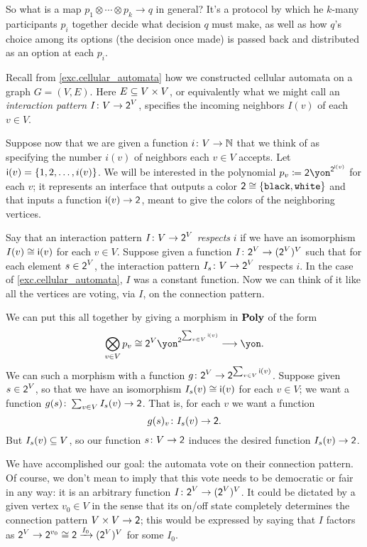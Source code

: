 \documentclass[Book-Poly]{subfiles}
\begin{document}
So what is a map $p_1\otimes\cdots\otimes p_k\to q$ in general? It's a protocol by which he $k$-many participants $p_i$ together decide what decision $q$ must make, as well as how $q$'s choice among its options (the decision once made) is passed back and distributed as an option at each $p_i$.

\begin{example}\label{ex.cell_auto_vote_interaction}
Recall from \cref{exc.cellular_automata} how we constructed cellular automata on a graph $G=(V,E)$. Here $E\ss V\times V$, or equivalently what we might call an \emph{interaction pattern} $I\colon V\to \2^V$, specifies the incoming neighbors $I(v)$ of each $v\in V$.

Suppose now that we are given a function $i\colon V\to\nn$ that we think of as specifying the number $i(v)$ of neighbors each $v\in V$ accepts. Let $\ord{i}(v)=\{1,2,\ldots, i(v)\}$. We will be interested in the polynomial $p_v\coloneqq\2\yon^{\2^{\ord{i}(v)}}$ for each $v$; it represents an interface that outputs a color $\2\cong\{\const{black},\const{white}\}$ and that inputs a function $\ord{i}(v)\to\2$, meant to give the colors of the neighboring vertices.

Say that an interaction pattern $I\colon V\to\2^V$ \emph{respects} $i$ if we have an isomorphism $I(v)\cong\ord{i}(v)$ for each $v\in V$. Suppose given a function $I\colon \2^V\to (\2^V)^V$ such that for each element $s\in\2^V$, the interaction pattern $I_s\colon V\to \2^V$ respects $i$. In the case of \cref{exc.cellular_automata}, $I$ was a constant function. Now we can think of it like all the vertices are voting, via $I$, on the connection pattern. 

We can put this all together by giving a morphism in $\poly$ of the form
\begin{equation}\label{eqn.polymap_misc9237}
\bigotimes_{v\in V}p_v\cong\2^V\yon^{\2^{\sum_{v\in V}\ord{i}(v)}}\too\yon.
\end{equation}
We can such a morphism with a function $g\colon \2^V\to\2^{\sum_{v\in V}\ord{i}(v)}$. Suppose given $s\in\2^V$, so that we have an isomorphism $I_s(v)\cong\ord{i}(v)$ for each $v\in V$; we want a function $g(s)\colon\sum_{v\in V}I_s(v)\to\2$. That is, for each $v$ we want a function
\[
g(s)_v\colon I_s(v)\to\2.
\]
But $I_s(v)\ss V$, so our function $s\colon V\to\2$ induces the desired function $I_s(v)\to\2$.

We have accomplished our goal: the automata vote on their connection pattern. Of course, we don't mean to imply that this vote needs to be democratic or fair in any way: it is an arbitrary function $I\colon \2^V\to(\2^V)^V$. It could be dictated by a given vertex $v_0\in V$ in the sense that its on/off state completely determines the connection pattern $V\times V\to \2$; this would be expressed by saying that $I$ factors as $\2^V\to\2^{v_0}\cong\2\To{I_0}(\2^V)^V$ for some $I_0$.
\end{example}
\end{document}
